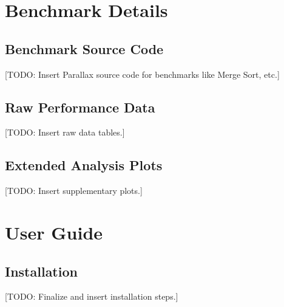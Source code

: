\section{Benchmark Details} %

\subsection{Benchmark Source Code} %
[TODO: Insert Parallax source code for benchmarks like Merge Sort, etc.]

\subsection{Raw Performance Data} %
[TODO: Insert raw data tables.]

\subsection{Extended Analysis Plots} %
[TODO: Insert supplementary plots.]

\section{User Guide} %

\subsection{Installation} %
[TODO: Finalize and insert installation steps.]

